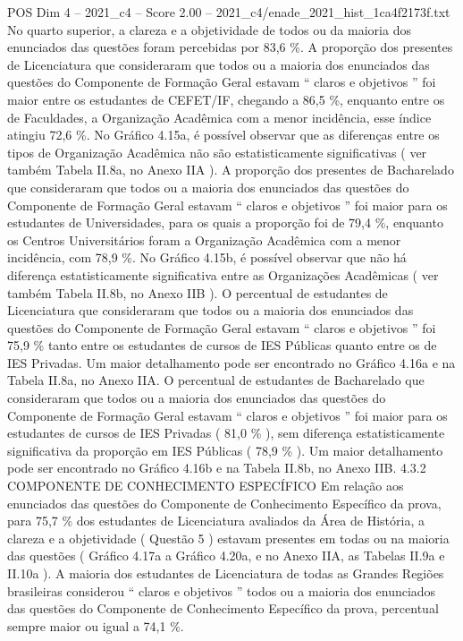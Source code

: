 \begin{textsample}{POS Dim 4 – 2021\_c4 – Score 2.00 – 2021\_c4/enade\_2021\_hist\_1ca4f2173f.txt}
No quarto superior, a clareza e a objetividade de todos ou da maioria dos enunciados das questões foram percebidas por 83,6 \%.
A proporção dos presentes de Licenciatura que consideraram que todos ou a maioria dos enunciados das questões do Componente de Formação Geral estavam “ claros e objetivos ” foi maior entre os estudantes de CEFET/IF, chegando a 86,5 \%, enquanto entre os de Faculdades, a Organização Acadêmica com a menor incidência, esse índice atingiu 72,6 \%.
No Gráfico 4.15a, é possível observar que as diferenças entre os tipos de Organização Acadêmica não são estatisticamente significativas ( ver também Tabela II.8a, no Anexo IIA ).
A proporção dos presentes de Bacharelado que consideraram que todos ou a maioria dos enunciados das questões do Componente de Formação Geral estavam “ claros e objetivos ” foi maior para os estudantes de Universidades, para os quais a proporção foi de 79,4 \%, enquanto os Centros Universitários foram a Organização Acadêmica com a menor incidência, com 78,9 \%.
No Gráfico 4.15b, é possível observar que não há diferença estatisticamente significativa entre as Organizações Acadêmicas ( ver também Tabela II.8b, no Anexo IIB ).
O percentual de estudantes de Licenciatura que consideraram que todos ou a maioria dos enunciados das questões do Componente de Formação Geral estavam “ claros e objetivos ” foi 75,9 \% tanto entre os estudantes de cursos de IES Públicas quanto entre os de IES Privadas.
Um maior detalhamento pode ser encontrado no Gráfico 4.16a e na Tabela II.8a, no Anexo IIA.
O percentual de estudantes de Bacharelado que consideraram que todos ou a maioria dos enunciados das questões do Componente de Formação Geral estavam “ claros e objetivos ” foi maior para os estudantes de cursos de IES Privadas ( 81,0 \% ), sem diferença estatisticamente significativa da proporção em IES Públicas ( 78,9 \% ).
Um maior detalhamento pode ser encontrado no Gráfico 4.16b e na Tabela II.8b, no Anexo IIB. 4.3.2 COMPONENTE DE CONHECIMENTO ESPECÍFICO Em relação aos enunciados das questões do Componente de Conhecimento Específico da prova, para 75,7 \% dos estudantes de Licenciatura avaliados da Área de História, a clareza e a objetividade ( Questão 5 ) estavam presentes em todas ou na maioria das questões ( Gráfico 4.17a a Gráfico 4.20a, e no Anexo IIA, as Tabelas II.9a e II.10a ).
A maioria dos estudantes de Licenciatura de todas as Grandes Regiões brasileiras considerou “ claros e objetivos ” todos ou a maioria dos enunciados das questões do Componente de Conhecimento Específico da prova, percentual sempre maior ou igual a 74,1 \%.

\end{textsample}
